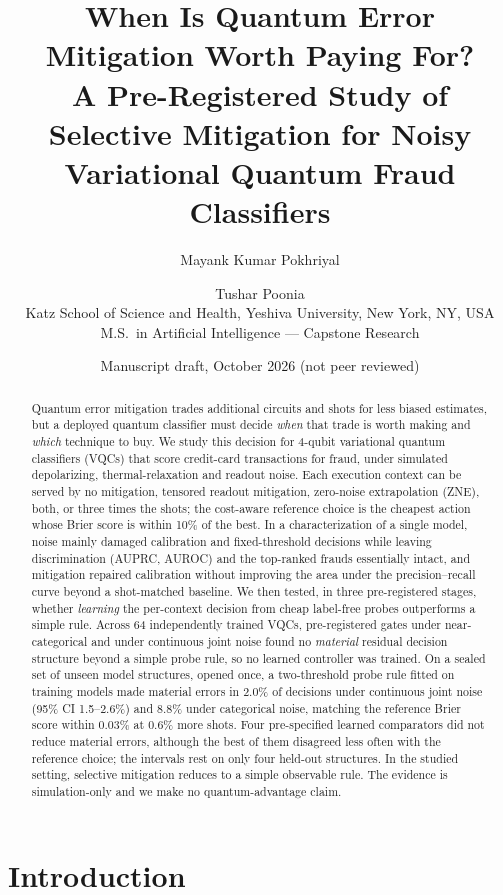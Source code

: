 \documentclass[11pt]{article}
\title{When Is Quantum Error Mitigation Worth Paying For?\\[2pt]
\large A Pre-Registered Study of Selective Mitigation for Noisy Variational Quantum Fraud Classifiers}
\author{Mayank Kumar Pokhriyal \and Tushar Poonia\\[4pt]
\small Katz School of Science and Health, Yeshiva University, New York, NY, USA\\
\small M.S.\ in Artificial Intelligence --- Capstone Research}
\date{Manuscript draft, October 2026 (not peer reviewed)}
\begin{document}
\maketitle

\begin{abstract}
Quantum error mitigation trades additional circuits and shots for less biased estimates, but a deployed quantum classifier must decide \emph{when} that trade is worth making and \emph{which} technique to buy.
We study this decision for 4-qubit variational quantum classifiers (VQCs) that score credit-card transactions for fraud, under simulated depolarizing, thermal-relaxation and readout noise.
Each execution context can be served by no mitigation, tensored readout mitigation, zero-noise extrapolation (ZNE), both, or three times the shots; the cost-aware reference choice is the cheapest action whose Brier score is within 10\% of the best.
In a characterization of a single model, noise mainly damaged calibration and fixed-threshold decisions while leaving discrimination (AUPRC, AUROC) and the top-ranked frauds essentially intact, and mitigation repaired calibration without improving the area under the precision--recall curve beyond a shot-matched baseline.
We then tested, in three pre-registered stages, whether \emph{learning} the per-context decision from cheap label-free probes outperforms a simple rule.
Across 64 independently trained VQCs, pre-registered gates under near-categorical and under continuous joint noise found no \emph{material} residual decision structure beyond a simple probe rule, so no learned controller was trained.
On a sealed set of unseen model structures, opened once, a two-threshold probe rule fitted on training models made material errors in 2.0\% of decisions under continuous joint noise (95\% CI 1.5--2.6\%) and 8.8\% under categorical noise, matching the reference Brier score within 0.03\% at 0.6\% more shots.
Four pre-specified learned comparators did not reduce material errors, although the best of them disagreed less often with the reference choice; the intervals rest on only four held-out structures.
In the studied setting, selective mitigation reduces to a simple observable rule.
The evidence is simulation-only and we make no quantum-advantage claim.
\end{abstract}

\section{Introduction}
\end{document}
